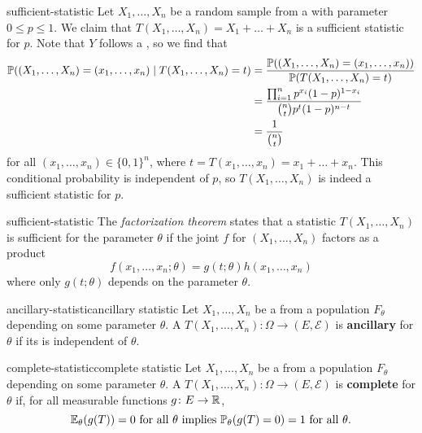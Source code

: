 \begin{example}{sufficient-statistic}
    Let $X_1, \ldots, X_n$ be a random sample from a  with parameter $0 \le p \le 1$. We claim that $T(X_1, \ldots, X_n) = X_1 + \ldots + X_n$ is a sufficient statistic for $p$. Note that $Y$ follows a , so we find that
    \[ \begin{aligned}
        \mathbb{P}((X_1, \ldots, X_n) = (x_1, \ldots, x_n) \mid T(X_1, \ldots, X_n) = t)
            &= \frac{\mathbb{P}((X_1, \ldots, X_n) = (x_1, \ldots, x_n))}{\mathbb{P}(T(X_1, \ldots, X_n) = t)} \\
            &= \frac{\prod_{i = 1}^{n} p^{x_i} (1 - p)^{1 - x_i}}{\binom{n}{t} p^t (1 - p)^{n - t}} \\
            &= \frac{1}{\binom{n}{t}}
    \end{aligned} \]
    for all $(x_1, \ldots, x_n) \in \{ 0, 1 \}^n$, where $t = T(x_1, \ldots, x_n) = x_1 + \ldots + x_n$. This conditional probability is independent of $p$, so $T(X_1, \ldots, X_n)$ is indeed a sufficient statistic for $p$.
\end{example}

\begin{example}{sufficient-statistic}
    The \textit{factorization theorem} states that a statistic $T(X_1, \ldots, X_n)$ is sufficient for the parameter $\theta$ if the joint  $f$ for $(X_1, \ldots, X_n)$ factors as a product
    \[ f(x_1, \ldots, x_n; \theta) = g(t; \theta) h(x_1, \ldots, x_n) \]
    where only $g(t; \theta)$ depends on the parameter $\theta$.
\end{example}

\begin{topic}{ancillary-statistic}{ancillary statistic}
    Let $X_1, \ldots, X_n$ be a  from a population $F_\theta$ depending on some parameter $\theta$. A  $T(X_1, \ldots, X_n) \colon \Omega \to (E, \mathcal{E})$ is \textbf{ancillary} for $\theta$ if its  is independent of $\theta$.
\end{topic}

\begin{topic}{complete-statistic}{complete statistic}
    Let $X_1, \ldots, X_n$ be a  from a population $F_\theta$ depending on some parameter $\theta$. A  $T(X_1, \ldots, X_n) \colon \Omega \to (E, \mathcal{E})$ is \textbf{complete} for $\theta$ if, for all measurable functions $g \colon E \to \mathbb{R}$,
    \[ \mathbb{E}_\theta(g(T)) = 0 \textup{ for all } \theta \textup{ implies } \mathbb{P}_\theta(g(T) = 0) = 1 \textup{ for all } \theta . \]
\end{topic}

